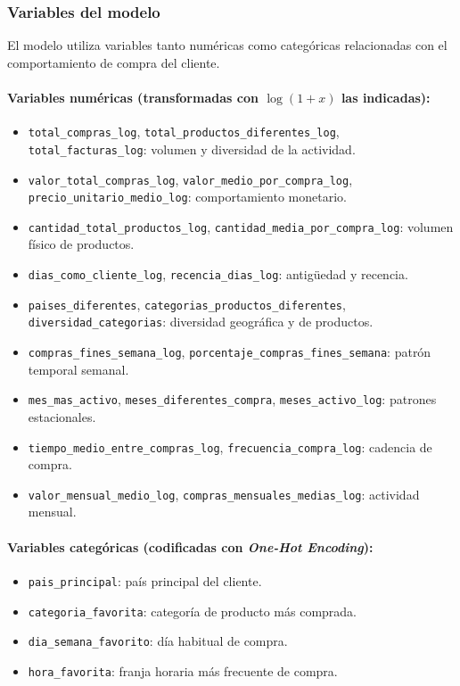\documentclass[11pt,a4paper]{article}
\begin{document}
\subsubsection{Variables del modelo}

El modelo utiliza variables tanto numéricas como categóricas relacionadas con el comportamiento de compra del cliente.

\paragraph{Variables numéricas (transformadas con $\log(1+x)$ las indicadas):}
\begin{itemize}
    \item \texttt{total\_compras\_log}, \texttt{total\_productos\_diferentes\_log}, \texttt{total\_facturas\_log}: volumen y diversidad de la actividad.
    \item \texttt{valor\_total\_compras\_log}, \texttt{valor\_medio\_por\_compra\_log}, \texttt{precio\_unitario\_medio\_log}: comportamiento monetario.
    \item \texttt{cantidad\_total\_productos\_log}, \texttt{cantidad\_media\_por\_compra\_log}: volumen físico de productos.
    \item \texttt{dias\_como\_cliente\_log}, \texttt{recencia\_dias\_log}: antigüedad y recencia.
    \item \texttt{paises\_diferentes}, \texttt{categorias\_productos\_diferentes}, \texttt{diversidad\_categorias}: diversidad geográfica y de productos.
    \item \texttt{compras\_fines\_semana\_log}, \texttt{porcentaje\_compras\_fines\_semana}: patrón temporal semanal.
    \item \texttt{mes\_mas\_activo}, \texttt{meses\_diferentes\_compra}, \texttt{meses\_activo\_log}: patrones estacionales.
    \item \texttt{tiempo\_medio\_entre\_compras\_log}, \texttt{frecuencia\_compra\_log}: cadencia de compra.
    \item \texttt{valor\_mensual\_medio\_log}, \texttt{compras\_mensuales\_medias\_log}: actividad mensual.
\end{itemize}

\paragraph{Variables categóricas (codificadas con \textit{One-Hot Encoding}):}
\begin{itemize}
    \item \texttt{pais\_principal}: país principal del cliente.
    \item \texttt{categoria\_favorita}: categoría de producto más comprada.
    \item \texttt{dia\_semana\_favorito}: día habitual de compra.
    \item \texttt{hora\_favorita}: franja horaria más frecuente de compra.
\end{itemize}
\end{document}
